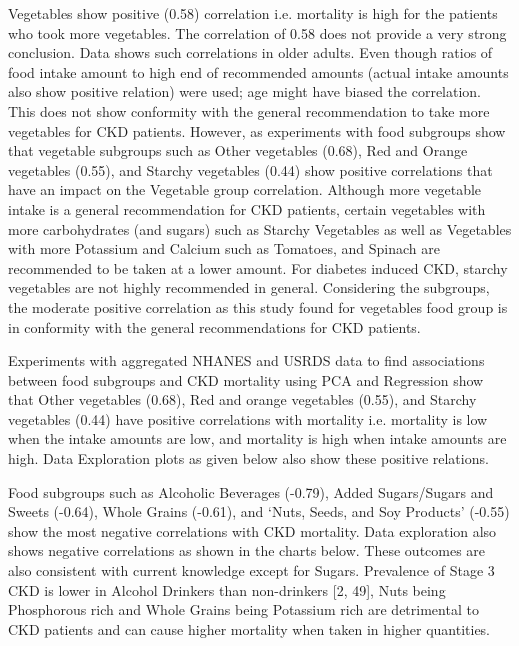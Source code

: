 \noindent Vegetables show positive (0.58) correlation i.e. mortality is high for the patients who took more vegetables. The correlation of 0.58 does not provide a very strong conclusion. Data shows such correlations in older adults. Even though ratios of food intake amount to high end of recommended amounts (actual intake amounts also show positive relation) were used; age might have biased the correlation. This does not show conformity with the general recommendation to take more vegetables for CKD patients. However, as experiments with food subgroups show that vegetable subgroups such as Other vegetables (0.68), Red and Orange vegetables (0.55), and Starchy vegetables (0.44) show positive correlations that have an impact on the Vegetable group correlation.  Although more vegetable intake is a general recommendation for CKD patients, certain vegetables with more carbohydrates (and sugars) such as Starchy Vegetables as well as Vegetables with more Potassium and Calcium such as Tomatoes, and Spinach are recommended to be taken at a lower amount. For diabetes induced CKD, starchy vegetables are not highly recommended in general. Considering the subgroups, the moderate positive correlation as this study found for vegetables food group is in conformity with the general recommendations for CKD patients.

\noindent Experiments with aggregated NHANES and USRDS data to find associations between food subgroups and CKD mortality using PCA and Regression show that  Other vegetables (0.68),    Red and orange vegetables (0.55), and Starchy vegetables (0.44)  have positive correlations with mortality i.e. mortality is low when the intake amounts are low, and mortality is high when intake amounts are high. Data Exploration plots as given below also show these positive relations.

\noindent  Food subgroups such as Alcoholic Beverages (-0.79),    Added Sugars/Sugars and Sweets (-0.64), Whole Grains (-0.61), and  `Nuts, Seeds, and Soy Products' (-0.55) show the most negative correlations with CKD mortality. Data exploration also shows negative correlations as shown in the charts below. These outcomes are also consistent with current knowledge except for Sugars. Prevalence of Stage 3 CKD is lower in Alcohol Drinkers than non-drinkers [2, 49], Nuts being Phosphorous rich and Whole Grains being Potassium rich are detrimental to CKD patients and can cause higher mortality when taken in higher quantities.

